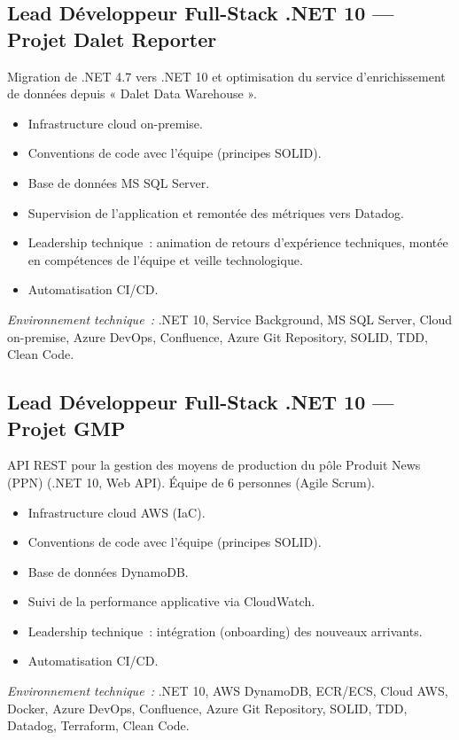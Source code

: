 \documentclass[10pt,a4paper]{article}
\begin{document}
\vspace{4pt}

\subsection*{Lead Développeur Full-Stack .NET 10 --- Projet Dalet Reporter}
\color{darkgray}
Migration de .NET 4.7 vers .NET 10 et optimisation du service d'enrichissement de données depuis « Dalet Data Warehouse ».
\begin{itemize}
  \item Infrastructure cloud on-premise.
  \item Conventions de code avec l'équipe (principes SOLID).
  \item Base de données MS SQL Server.
  \item Supervision de l'application et remontée des métriques vers Datadog.
  \item Leadership technique~: animation de retours d'expérience techniques, montée en compétences de l'équipe et veille technologique.
  \item Automatisation CI/CD.
\end{itemize}
\textit{Environnement technique~:} .NET 10, Service Background, MS SQL Server, Cloud on-premise, Azure DevOps, Confluence, Azure Git Repository, SOLID, TDD, Clean Code.

\vspace{6pt}

\subsection*{Lead Développeur Full-Stack .NET 10 --- Projet GMP}
\color{darkgray}
API REST pour la gestion des moyens de production du pôle Produit News (PPN) (.NET 10, Web API). Équipe de 6 personnes (Agile Scrum).
\begin{itemize}
  \item Infrastructure cloud AWS (IaC).
  \item Conventions de code avec l'équipe (principes SOLID).
  \item Base de données DynamoDB.
  \item Suivi de la performance applicative via CloudWatch.
  \item Leadership technique~: intégration (onboarding) des nouveaux arrivants.
  \item Automatisation CI/CD.
\end{itemize}
\textit{Environnement technique~:} .NET 10, AWS DynamoDB, ECR/ECS, Cloud AWS, Docker, Azure DevOps, Confluence, Azure Git Repository, SOLID, TDD, Datadog, Terraform, Clean Code.
\end{document}

